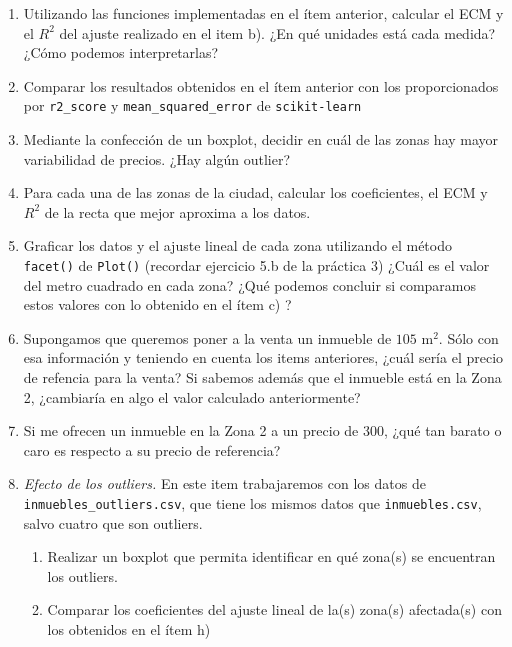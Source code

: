 \documentclass[a4paper,11pt]{article}
\theoremstyle{definition}
\begin{document}
\begin{enumerate}[resume]
\begin{enumerate}
    \item Utilizando las funciones implementadas en el ítem anterior, calcular el ECM y el $R^2$ del ajuste realizado en el item b). ¿En qué unidades está cada medida? ¿Cómo podemos interpretarlas?

    \item Comparar los resultados obtenidos en el ítem anterior con los proporcionados por \texttt{r2\_score} y \texttt{mean\_squared\_error} de \texttt{scikit-learn}

    \item Mediante la confección de un boxplot, decidir en cuál de las zonas hay mayor variabilidad de precios. ¿Hay algún outlier?

    \item Para cada una de las zonas de la ciudad, calcular los coeficientes, el ECM y $R^2$ de la recta que mejor aproxima a los datos.
    
    \item Graficar los datos y el ajuste lineal de cada zona utilizando el método \lstinline{facet()} de \lstinline{Plot()} (recordar ejercicio 5.b de la práctica 3) ¿Cuál es el valor del metro cuadrado en cada zona? ¿Qué podemos concluir si comparamos estos valores con lo obtenido en el ítem c) ?

    \item Supongamos que queremos poner a la venta un inmueble de $105$ m$^2$. Sólo con esa información y teniendo en cuenta los items anteriores, ¿cuál sería el precio de refencia para la venta? Si sabemos además que el inmueble está en la Zona 2, ¿cambiaría en algo el valor calculado anteriormente? 

    \item Si me ofrecen un inmueble en la Zona 2 a un precio de 300, ¿qué tan barato o caro es respecto a su precio de referencia?

    \item \textit{Efecto de los outliers.} En este item trabajaremos con los datos de \texttt{inmuebles\_outliers.csv}, que tiene los mismos datos que \texttt{inmuebles.csv}, salvo cuatro que son outliers.
    \begin{enumerate}
        \item Realizar un boxplot que permita identificar en qué zona(s) se encuentran los outliers.
        \item Comparar los coeficientes del ajuste lineal de la(s) zona(s) afectada(s) con los obtenidos en el ítem h)
    \end{enumerate}
    


\end{enumerate}
\end{enumerate}
\end{document}
